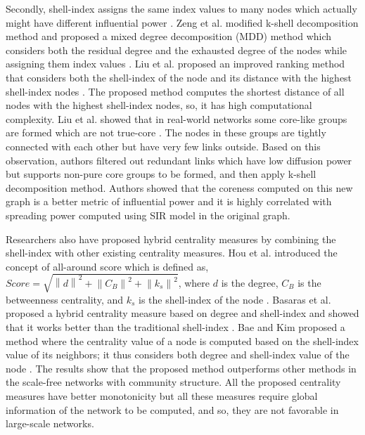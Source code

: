\documentclass[conference]{IEEEtran}
\begin{document}
Secondly, shell-index assigns the same index values to many nodes which actually might have different influential power \cite{zareie2018hierarchical, wang2016fast, zeng2013ranking}. Zeng et al. modified k-shell decomposition method and proposed a mixed degree decomposition (MDD) method which considers both the residual degree and the exhausted degree of the nodes while assigning them index values \cite{zeng2013ranking}. Liu et al. proposed an improved ranking method that considers both the shell-index of the node and its distance with the highest shell-index nodes \cite{liu2013ranking}. The proposed method computes the shortest distance of all nodes with the highest shell-index nodes, so, it has high computational complexity. Liu et al. showed that in real-world networks some core-like groups are formed which are not true-core \cite{liu2015improving}. The nodes in these groups are tightly connected with each other but have very few links outside. Based on this observation, authors filtered out redundant links which have low diffusion power but supports non-pure core groups to be formed, and then apply k-shell decomposition method. Authors showed that the coreness computed on this new graph is a better metric of influential power and it is highly correlated with spreading power computed using SIR model in the original graph. 

Researchers also have proposed hybrid centrality measures by combining the shell-index with other existing centrality measures. Hou et al. introduced the concept of all-around score which is defined as, $Score=\sqrt{\left \| d \right \|^2 + \left \| C_B \right \| ^2 +\left \| k_s \right \|^2 }$, where $d$ is the degree, $C_B$ is the betweenness centrality, and $k_s$ is the shell-index of the node \cite{hou2012identifying}. Basaras et al. proposed a hybrid centrality measure based on degree and shell-index and showed that it works better than the traditional shell-index \cite{basaras2013detecting}. Bae and Kim proposed a method where the centrality value of a node is computed based on the shell-index value of its neighbors; it thus considers both degree and shell-index value of the node \cite{bae2014identifying}. The results show that the proposed method outperforms other methods in the scale-free networks with community structure. 
All the proposed centrality measures have better monotonicity but all these measures require global information of the network to be computed, and so, they are not favorable in large-scale networks.
\end{document}
